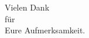 \documentclass[11pt]{beamer}
\begin{document}
\begin{frame}
    \vspace*{0.9cm}
    \centering
    \Huge
    Vielen Dank\\
    für\\
    Eure Aufmerksamkeit.\\
\end{frame}
\end{document}
